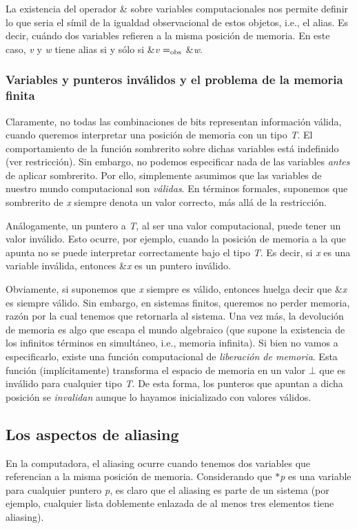 La existencia del operador \& sobre variables computacionales nos permite definir lo que seria el símil de la igualdad observacional de estos objetos, i.\+e., el alias. Es decir, cuándo dos variables refieren a la misma posición de memoria. En este caso, {\itshape v} y {\itshape w} tiene alias si y sólo si \&{\itshape v} $=_{\rm obs}$ \&{\itshape w}.\hypertarget{Aliasing_sec-invalido}{}\subsubsection{Variables y punteros inválidos y el problema de la memoria finita}\label{Aliasing_sec-invalido}
Claramente, no todas las combinaciones de bits representan información válida, cuando queremos interpretar una posición de memoria con un tipo {\itshape T}. El comportamiento de la función sombrerito sobre dichas variables está indefinido (ver restricción). Sin embargo, no podemos especificar nada de las variables {\itshape antes} de aplicar sombrerito. Por ello, simplemente asumimos que las variables de nuestro mundo computacional son {\itshape válidas}. En términos formales, suponemos que sombrerito de {\itshape x} siempre denota un valor correcto, más allá de la restricción.

Análogamente, un puntero a {\itshape T}, al ser una valor computacional, puede tener un valor inválido. Esto ocurre, por ejemplo, cuando la posición de memoria a la que apunta no se puede interpretar correctamente bajo el tipo {\itshape T}. Es decir, si {\itshape x} es una variable inválida, entonces \&{\itshape x} es un puntero inválido.

Obviamente, si suponemos que {\itshape x} siempre es válido, entonces huelga decir que \&{\itshape x} es siempre válido. Sin embargo, en sistemas finitos, queremos no perder memoria, razón por la cual tenemos que retornarla al sistema. Una vez más, la devolución de memoria es algo que escapa el mundo algebraico (que supone la existencia de los infinitos términos en simultáneo, i.\+e., memoria infinita). Si bien no vamos a especificarlo, existe una función computacional de {\itshape liberación de memoria}. Esta función (implícitamente) transforma el espacio de memoria en un valor $\bot$ que es inválido para cualquier tipo {\itshape T}. De esta forma, los punteros que apuntan a dicha posición se {\itshape invalidan} aunque lo hayamos inicializado con valores válidos.\hypertarget{Aliasing_sec-aliasing}{}\subsection{Los aspectos de aliasing}\label{Aliasing_sec-aliasing}
En la computadora, el aliasing ocurre cuando tenemos dos variables que referencian a la misma posición de memoria. Considerando que $\ast${\itshape p} es una variable para cualquier puntero {\itshape p}, es claro que el aliasing es parte de un sistema (por ejemplo, cualquier lista doblemente enlazada de al menos tres elementos tiene aliasing).

